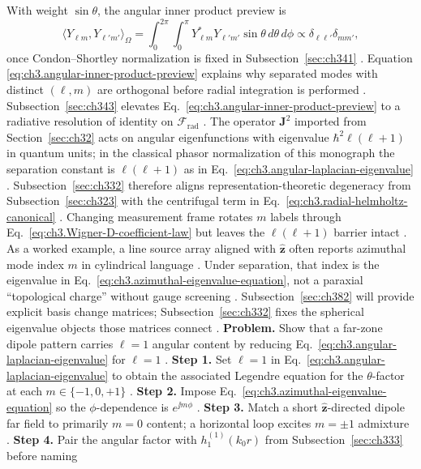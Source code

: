 With weight \(\sin\theta\), the angular inner product preview is
\begin{equation}
\label{eq:ch3.angular-inner-product-preview}
\langle Y_{\ell m},Y_{\ell' m'}\rangle_{\Omega}
=
\int_{0}^{2\pi}\!\int_{0}^{\pi}
Y_{\ell m}^{*}Y_{\ell' m'}\sin\theta\,d\theta\,d\phi
\propto
\delta_{\ell\ell'}\delta_{mm'},
\end{equation}
once Condon--Shortley normalization is fixed in Subsection~\ref{sec:ch341} . Equation
\eqref{eq:ch3.angular-inner-product-preview} explains why separated modes with distinct \((\ell,m)\) are
orthogonal before radial integration is performed . Subsection~\ref{sec:ch343} elevates
Eq.~\eqref{eq:ch3.angular-inner-product-preview} to a radiative resolution of identity on
\(\mathcal{F}_{\mathrm{rad}}\) .
The operator \(\mathbf{J}^{2}\) imported from Section~\ref{sec:ch32} acts on angular eigenfunctions with eigenvalue
\(\hbar^{2}\ell(\ell+1)\) in quantum units; in the classical phasor normalization of this monograph the separation
constant is \(\ell(\ell+1)\) as in Eq.~\eqref{eq:ch3.angular-laplacian-eigenvalue} .
Subsection~\ref{sec:ch332} therefore aligns representation-theoretic degeneracy from Subsection~\ref{sec:ch323}
with the centrifugal term in Eq.~\eqref{eq:ch3.radial-helmholtz-canonical} . Changing
measurement frame rotates \(m\) labels through Eq.~\eqref{eq:ch3.Wigner-D-coefficient-law} but leaves the
\(\ell(\ell+1)\) barrier intact .
As a worked example, a line source array aligned with \(\hat{\mathbf{z}}\) often reports azimuthal mode index \(m\) in cylindrical
language . Under separation, that index is the eigenvalue in
Eq.~\eqref{eq:ch3.azimuthal-eigenvalue-equation}, not a paraxial ``topological charge'' without gauge screening
. Subsection~\ref{sec:ch382} will provide explicit basis change matrices; Subsection~\ref{sec:ch332}
fixes the spherical eigenvalue objects those matrices connect .
\textbf{Problem.} Show that a far-zone dipole pattern carries \(\ell=1\) angular content by reducing
Eq.~\eqref{eq:ch3.angular-laplacian-eigenvalue} for \(\ell=1\) .
\textbf{Step 1.} Set \(\ell=1\) in Eq.~\eqref{eq:ch3.angular-laplacian-eigenvalue} to obtain the associated
Legendre equation for the \(\theta\)-factor at each \(m\in\{-1,0,+1\}\) .
\textbf{Step 2.} Impose Eq.~\eqref{eq:ch3.azimuthal-eigenvalue-equation} so the \(\phi\)-dependence is
\(e^{\jj m\phi}\) .
\textbf{Step 3.} Match a short \(\hat{\mathbf{z}}\)-directed dipole far field to primarily \(m=0\) content; a
horizontal loop excites \(m=\pm1\) admixture .
\textbf{Step 4.} Pair the angular factor with \(h_{1}^{(1)}(k_{0}r)\) from Subsection~\ref{sec:ch333} before naming
